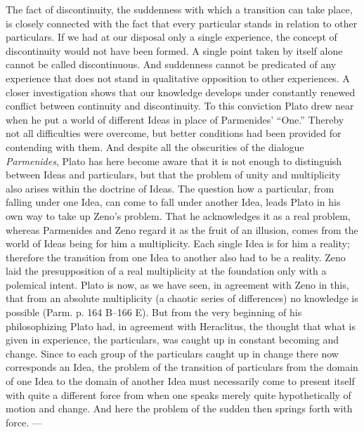 \documentclass[12pt,a4paper,openany]{book}
\newcommand{\opage}[1]{\marginnote{\footnotesize\textit{[#1]}}}
\begin{document}
The fact of discontinuity, the suddenness with which
a transition can take place, is closely connected with the fact that
every particular stands in relation to other particulars.  If we
had at our disposal only a single experience, the concept of
discontinuity would not have been formed.  A single point taken by itself
alone cannot be called discontinuous.  And suddenness cannot
be predicated of any experience that does not stand in qualitative
opposition to other experiences.  A closer investigation
shows that our knowledge develops under constantly renewed
conflict between continuity and discontinuity.  To this
\setcounter{footnote}{0}%
\opage{43}conviction Plato drew near when he put a world
of different Ideas in place of Parmenides' ``One.''  Thereby
not all difficulties were overcome, but better conditions
had been provided for contending with them.  And
despite all the obscurities of the dialogue \textit{Parmenides}, Plato
has here become aware that it is not enough to
distinguish between Ideas and particulars, but that the problem of unity
and multiplicity also arises within the doctrine of Ideas.  The
question how a particular, from falling under one
Idea, can come to fall under another Idea, leads Plato
in his own way to take up Zeno's problem.  That he
acknowledges it as a real problem, whereas Parmenides
and Zeno regard it as the fruit of an illusion,
comes from the world of Ideas being for him a multiplicity.
Each single Idea is for him a reality; therefore the
transition from one Idea to another also had to be a reality.
Zeno laid the presupposition of a real multiplicity at the foundation
only with a polemical intent.  Plato is now, as
we have seen, in agreement with Zeno in this, that from an absolute
multiplicity (a chaotic series of differences) no knowledge
is possible (Parm. p. 164 B--166 E).  But from the very
beginning of his philosophizing Plato had, in agreement with Heraclitus,
the thought that what is given in experience, the particulars, was
caught up in constant becoming and change.  Since to each
group of the particulars caught up in change there now corresponds an Idea,
the problem of the transition of particulars from the domain of one Idea
to the domain of another Idea must necessarily come to
present itself with quite a different force from when one
speaks merely quite hypothetically of motion and change.  And
here the problem of the sudden then springs forth with force. ---
\end{document}

